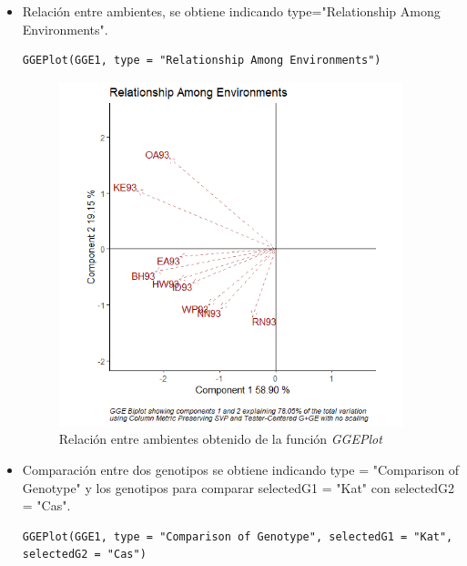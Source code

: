 \begin{itemize}
\item Relación entre ambientes, se obtiene indicando type="Relationship Among Environments".

\begin{lstlisting}
GGEPlot(GGE1, type = "Relationship Among Environments")
\end{lstlisting}

\begin{figure}[h]
	\begin{center}
		\includegraphics[width=10cm]{./Graficos/RelationshipAmongEnvironments.png}
	\end{center}
	\caption{Relación entre ambientes obtenido de la función \emph{GGEPlot}}
\end{figure}

\item Comparación entre dos genotipos se obtiene indicando type = "Comparison of Genotype" y los genotipos para comparar selectedG1 = "Kat" con selectedG2 = "Cas".

\begin{lstlisting}
GGEPlot(GGE1, type = "Comparison of Genotype", selectedG1 = "Kat", selectedG2 = "Cas")
\end{lstlisting}


\end{itemize}
